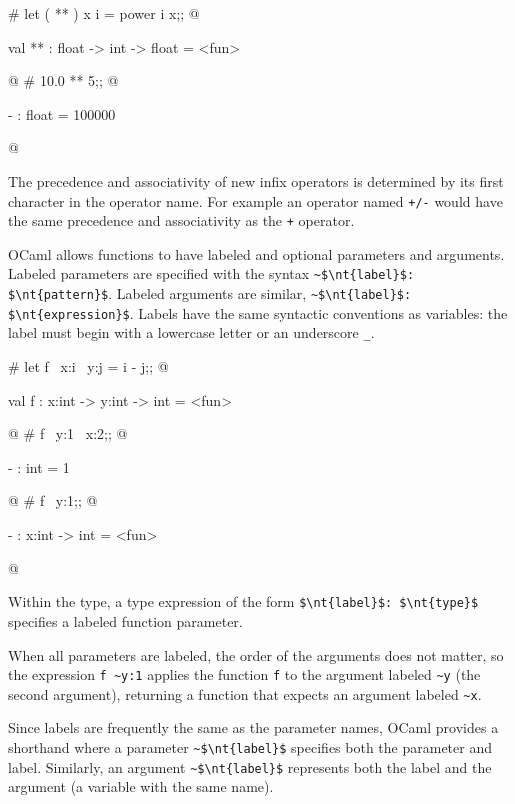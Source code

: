 \begin{ocaml}
# let ( ** ) x i = power i x;;
@
\begin{topoutput}
val ** : float -> int -> float = <fun>
\end{topoutput}
@
# 10.0 ** 5;;
@
\begin{topoutput}
- : float = 100000
\end{topoutput}
@
\end{ocaml}
%
The precedence and associativity of new infix operators is determined
by its first character in the operator name.  For example an operator
named \lstinline$+/-$ would have the same precedence and associativity as
the \hbox{\lstinline/+/} operator.

\label{literal:label}

OCaml allows functions to have labeled and optional parameters and
arguments.  Labeled parameters are specified with the
syntax \hbox{\lstinline/~$\nt{label}$: $\nt{pattern}$/}.  Labeled arguments
are similar, \hbox{\lstinline/~$\nt{label}$: $\nt{expression}$/}.  Labels
have the same syntactic conventions as variables: the label must begin
with a lowercase letter or an underscore \hbox{\lstinline/_/}.

\begin{ocaml}
# let f ~x:i ~y:j = i - j;;
@
\begin{topoutput}
val f : x:int -> y:int -> int = <fun>
\end{topoutput}
@
# f ~y:1 ~x:2;;
@
\begin{topoutput}
- : int = 1
\end{topoutput}
@
# f ~y:1;;
@
\begin{topoutput}
- : x:int -> int = <fun>
\end{topoutput}
@
\end{ocaml}
%
Within the type, a type expression of the
form \hbox{\lstinline/$\nt{label}$: $\nt{type}$/} specifies a labeled
function parameter.

When all parameters are labeled, the order of the
arguments does not matter, so the expression \hbox{\lstinline/f ~y:1/}
applies the function \hbox{\lstinline/f/} to the argument
labeled \hbox{\lstinline/~y/} (the second argument), returning a function
that expects an argument labeled \hbox{\lstinline/~x/}.

Since labels are frequently the same as the parameter names, OCaml
provides a shorthand where a parameter \hbox{\lstinline/~$\nt{label}$/}
specifies both the parameter and label.  Similarly, an
argument \hbox{\lstinline/~$\nt{label}$/} represents both the label and the
argument (a variable with the same name).

